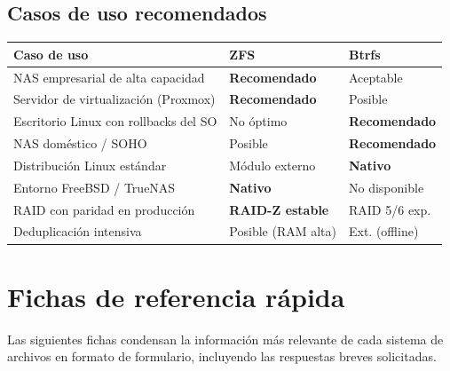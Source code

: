 \documentclass[12pt,letterpaper]{article}
\begin{document}
\subsection{Casos de uso recomendados}

\begin{center}
  \renewcommand{\arraystretch}{1.3}
  \begin{tabular}{p{5.5cm} p{3.5cm} p{3.5cm}}
    \hline
    \textbf{Caso de uso} & \textbf{ZFS} & \textbf{Btrfs} \\
    \hline
    NAS empresarial de alta capacidad & \textbf{Recomendado} & Aceptable \\
    Servidor de virtualización (Proxmox) & \textbf{Recomendado} & Posible \\
    Escritorio Linux con rollbacks del SO & No óptimo & \textbf{Recomendado} \\
    NAS doméstico / SOHO & Posible & \textbf{Recomendado} \\
    Distribución Linux estándar & Módulo externo & \textbf{Nativo} \\
    Entorno FreeBSD / TrueNAS & \textbf{Nativo} & No disponible \\
    RAID con paridad en producción & \textbf{RAID-Z estable} & RAID 5/6 exp. \\
    Deduplicación intensiva & Posible (RAM alta) & Ext. (offline) \\
    \hline
  \end{tabular}
\end{center}

\newpage

\section{Fichas de referencia rápida}
Las siguientes fichas condensan la información más relevante de cada sistema de archivos en formato de
formulario, incluyendo las respuestas breves solicitadas.

\bigskip
\end{document}
